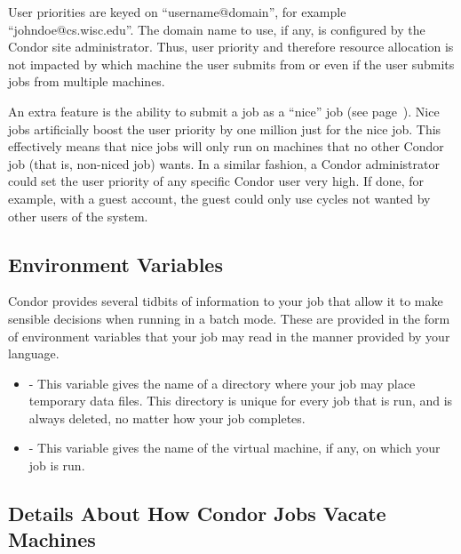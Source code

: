 User priorities are keyed on ``username@domain'', for example
``johndoe@cs.wisc.edu''. The domain name to use, if any, is configured by
the Condor site administrator.  Thus, user priority and therefore resource
allocation is not impacted by which machine the user submits from or
even if the user submits jobs from multiple machines.

An extra feature is the ability to submit a job as
a ``nice'' job (see page~\pageref{man-condor-submit-nice}).
Nice jobs artificially boost the user priority 
by one million just for the nice job.
This effectively means that nice jobs will only run on
machines that no other Condor job (that is, non-niced job) wants.
In a similar fashion, a Condor administrator could set
the user priority of any specific Condor user very high.
If done, for example, with a guest account,
the guest could only use cycles not wanted by other users of the system.

\subsection{Environment Variables}

Condor provides several tidbits of information to your job that
allow it to make sensible decisions when running in a batch mode.
These are provided in the form of environment variables that your
job may read in the manner provided by your language.

\begin{itemize}
\item {}  - This variable gives the name of a directory
where your job may place temporary data files.  This directory is unique for
every job that is run, and is always deleted, no matter how your job completes.
\item {}  - This variable gives the name of the virtual machine,
if any, on which your job is run.
\end{itemize}


\subsection{\label{sec:Vacate-Explained}
Details About How Condor Jobs Vacate Machines}

